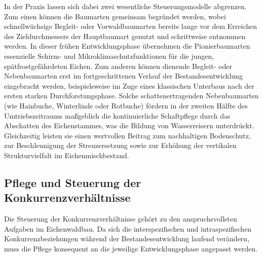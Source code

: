 \documentclass[twocolumn, bibliography=totoc, abstract=true]{scrartcl}
\begin{document}
In der Praxis lassen sich dabei zwei wesentliche Steuerungsmodelle abgrenzen. Zum einen können die Baumarten gemeinsam begründet werden, wobei schnellwüchsige Begleit- oder Vorwaldbaumarten bereits lange vor dem Erreichen des Zieldurchmessers der Hauptbaumart genutzt und schrittweise entnommen werden. In dieser frühen Entwicklungsphase übernehmen die Pionierbaumarten essenzielle Schirm- und Mikroklimaschutzfunktionen für die jungen, spätfrostgefährdeten Eichen. Zum anderen können dienende Begleit- oder Nebenbaumarten erst im fortgeschrittenen Verlauf der Bestandesentwicklung eingebracht werden, beispielsweise im Zuge eines klassischen Unterbaus nach der ersten starken Durchforstungsphase. Solche schattenertragenden Nebenbaumarten (wie Hainbuche, Winterlinde oder Rotbuche) fördern in der zweiten Hälfte des Umtriebszeitraums maßgeblich die kontinuierliche Schaftpflege durch das Abschatten des Eichenstammes, was die Bildung von Wasserreisern unterdrückt. Gleichzeitig leisten sie einen wertvollen Beitrag zum nachhaltigen Bodenschutz, zur Beschleunigung der Streuzersetzung sowie zur Erhöhung der vertikalen Strukturvielfalt im Eichenmischbestand.

\subsection{Pflege und Steuerung der Konkurrenzverhältnisse}

Die Steuerung der Konkurrenzverhältnisse gehört zu den anspruchsvollsten Aufgaben im Eichenwaldbau. Da sich die interspezifischen und intraspezifischen Konkurrenzbeziehungen während der Bestandesentwicklung laufend verändern, muss die Pflege konsequent an die jeweilige Entwicklungsphase angepasst werden. 
\end{document}
